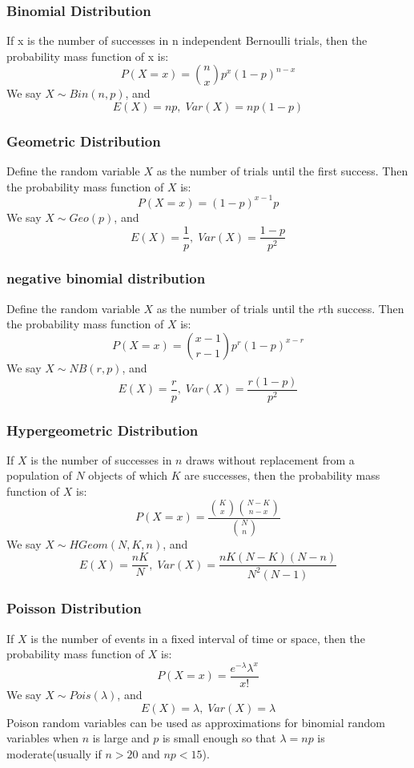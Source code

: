 \documentclass[a4paper,12pt]{article}
\begin{document}
\begin{multicols}{2}
\subsubsection*{Binomial Distribution}
If x is the number of successes in n independent Bernoulli trials, then the probability mass function of x is:
\[
P(X = x) = \binom{n}{x}p^x(1-p)^{n-x}
\]
We say $X\sim Bin(n,p)$, and $$E(X) = np, \; Var(X) = np(1-p)$$

\subsubsection*{Geometric Distribution}
Define the random variable $X$ as the number of trials until the first success. Then the probability mass function of $X$ is:
\[
P(X = x) = (1-p)^{x-1}p
\]
We say $X\sim Geo(p)$, and $$E(X) = \frac{1}{p}, \; Var(X) = \frac{1-p}{p^2}$$

\subsubsection*{negative binomial distribution}
Define the random variable $X$ as the number of trials until the $r$th success. Then the probability mass function of $X$ is:
\[
P(X = x) = \binom{x-1}{r-1}p^r(1-p)^{x-r}
\]
We say $X\sim NB(r,p)$, and $$E(X) = \frac{r}{p}, \; Var(X) = \frac{r(1-p)}{p^2}$$

\subsubsection*{Hypergeometric Distribution}
If $X$ is the number of successes in $n$ draws without replacement from a population of $N$ objects of which $K$ are successes, then the probability mass function of $X$ is:
\[
P(X = x) = \frac{\binom{K}{x}\binom{N-K}{n-x}}{\binom{N}{n}}
\]
We say $X\sim HGeom(N,K,n)$, and $$E(X) = \frac{nK}{N}, \; Var(X) = \frac{nK(N-K)(N-n)}{N^2(N-1)}$$

\subsubsection*{Poisson Distribution}
If $X$ is the number of events in a fixed interval of time or space, then the probability mass function of $X$ is:
\[
P(X = x) = \frac{e^{-\lambda}\lambda^x}{x!}
\]
We say $X\sim Pois(\lambda)$, and $$E(X) = \lambda, \;Var(X) = \lambda$$
Poison random variables can be used as approximations for binomial random variables when $n$ is large and $p$ is small enough so that $\lambda = np$ is moderate(usually if $n>20$ and $np<15$). 



\newpage


\end{multicols}
\end{document}
